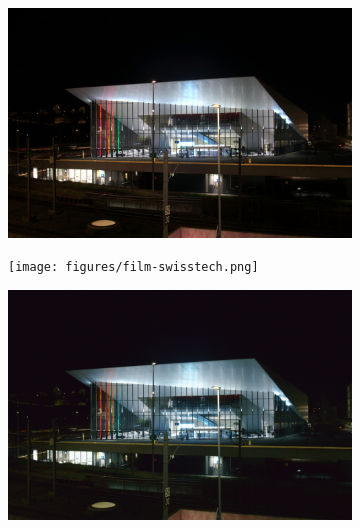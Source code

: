 \begin{figure}
    \begin{subfigure}[t]{.24\textwidth}
        \centering
        \includegraphics[width=\linewidth]{figures/digital-swisstech.png}
      \end{subfigure}
    \hfill
    \begin{subfigure}[t]{.24\textwidth}
        \centering
        \texttt{[image: figures/film-swisstech.png]}
      \end{subfigure}
    \hfill
    \begin{subfigure}[t]{.24\textwidth}
        \centering
        \includegraphics[width=\linewidth]{figures/mse-vgg-noise-resize-swisstech.png}
      \end{subfigure}
    \hfill
    \begin{subfigure}[t]{.24\textwidth}
      \centering

\end{subfigure}
\end{figure}

